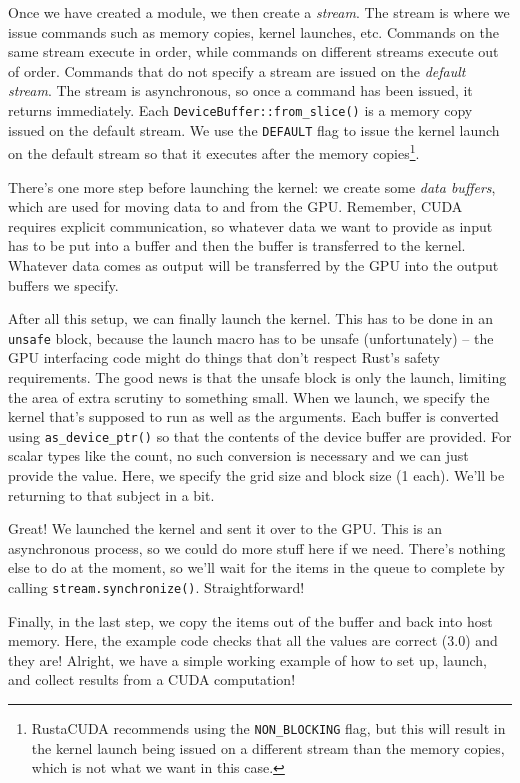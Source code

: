 Once we have created a module, we then create a \textit{stream}. The stream is where we issue commands such as memory copies, kernel launches, etc. Commands on the same stream execute in order, while commands on different streams execute out of order. Commands that do not specify a stream are issued on the \textit{default stream}. The stream is asynchronous, so once a command has been issued, it returns immediately. Each \texttt{DeviceBuffer::from\_slice()} is a memory copy issued on the default stream. We use the \texttt{DEFAULT} flag to issue the kernel launch on the default stream so that it executes after the memory copies\footnote{RustaCUDA recommends using the \texttt{NON\_BLOCKING} flag, but this will result in the kernel launch being issued on a different stream than the memory copies, which is not what we want in this case.}.

There's one more step before launching the kernel: we
create some \emph{data buffers}, which are used for moving data to and from the GPU. Remember, CUDA requires explicit communication, so whatever data we want to provide as input has to be put into a buffer and then the buffer is transferred to the kernel. Whatever data comes as output will be transferred by the GPU into the output buffers we specify.

After all this setup, we can finally launch the kernel. This has to be done in an \texttt{unsafe} block, because the launch macro has to be unsafe (unfortunately) -- the GPU interfacing code might do things that don't respect Rust's safety requirements. The good news is that the unsafe block is only the launch, limiting the area of extra scrutiny to something small. When we launch, we specify the kernel that's supposed to run as well as the arguments. Each buffer is converted using \texttt{as\_device\_ptr()} so that the contents of the device buffer are provided. For scalar types like the count, no such conversion is necessary and we can just provide the value. Here, we specify the grid size and block size (1 each). We'll be returning to that subject in a bit.

Great! We launched the kernel and sent it over to the GPU. This is an asynchronous process, so we could do more stuff here if we need. There's nothing else to do at the moment, so we'll wait for the items in the queue to complete by calling \texttt{stream.synchronize()}. Straightforward!

Finally, in the last step, we copy the items out of the buffer and back into host memory. Here, the example code checks that all the values are correct (3.0) and they are! Alright, we have a simple working example of how to set up, launch, and collect results from a CUDA computation!

